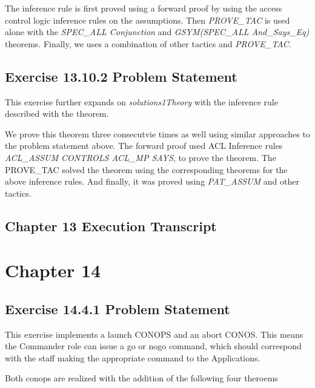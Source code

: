 \documentclass[11pt, twoside]{article}
\begin{document}
The inference rule is first proved using a forward proof by using the 
access control logic inference rules on the assumptions. Then \textit{PROVE_TAC} is used
alone with the \textit{SPEC_ALL Conjunction} and \textit{GSYM(SPEC_ALL And_Says_Eq)}
theorems. Finally, we uses a combination of other tactics and \textit{PROVE_TAC}.

\section{Exercise 13.10.2 Problem Statement}
\label{sec:exerc-13.10.2-probl}


This exercise further expands on \textit{solutions1Theory} with the inference rule described with 
the theorem.

\HOLsolutionsOneTheoremsaclExerciseTwoA

We prove this theorem three consecutvie times as well using similar approaches to the problem
statement above. The forward proof used ACL Inference rules \textit{ACL_ASSUM CONTROLS ACL_MP 
SAYS}, to prove the theorem. The PROVE_TAC solved the theorem using the corresponding 
theorems for the above inference rules. And finally, it was proved using \textit{PAT_ASSUM} 
and other tactics.

\section{Chapter 13 Execution Transcript}
\label{sec:chapter-13-execution}





\chapter{Chapter 14}
\label{cha:chapter-14}

\section{Exercise 14.4.1 Problem Statement}
\label{sec:exerc-14.4.1-probl}

This exercise implements a launch CONOPS and an abort CONOS. This means 
the Commander role can issue a go or nogo command, which should correspond with
the staff making the appropriate command to the Applications.

\HOLconopsZeroSolutionDatatypes

Both conops are realized with the addition of the following four theroems
\end{document}
